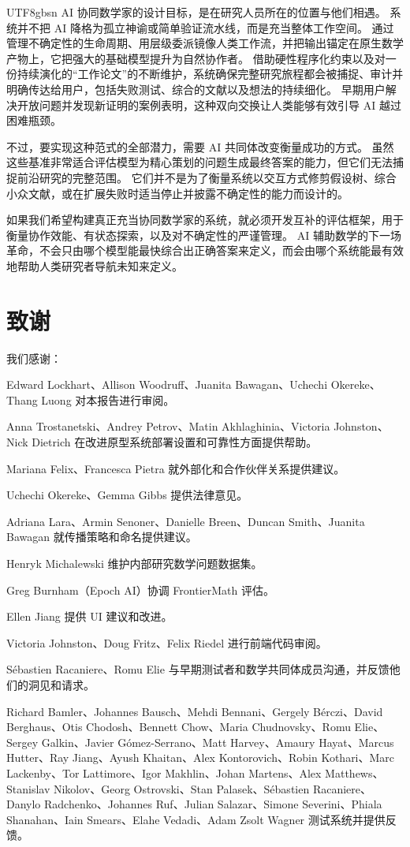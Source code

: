 \documentclass[11pt, a4paper, copyright, gdm]{google}
\begin{document}
\begin{CJK*}{UTF8}{gbsn}
AI 协同数学家的设计目标，是在研究人员所在的位置与他们相遇。
系统并不把 AI 降格为孤立神谕或简单验证流水线，而是充当整体工作空间。
通过管理不确定性的生命周期、用层级委派镜像人类工作流，并把输出锚定在原生数学产物上，它把强大的基础模型提升为自然协作者。
借助硬性程序化约束以及对一份持续演化的“工作论文”的不断维护，系统确保完整研究旅程都会被捕捉、审计并明确传达给用户，包括失败测试、综合的文献以及想法的持续细化。
早期用户解决开放问题并发现新证明的案例表明，这种双向交换让人类能够有效引导 AI 越过困难瓶颈。

不过，要实现这种范式的全部潜力，需要 AI 共同体改变衡量成功的方式。
虽然这些基准非常适合评估模型为精心策划的问题生成最终答案的能力，但它们无法捕捉前沿研究的完整范围。
它们并不是为了衡量系统以交互方式修剪假设树、综合小众文献，或在扩展失败时适当停止并披露不确定性的能力而设计的。

如果我们希望构建真正充当协同数学家的系统，就必须开发互补的评估框架，用于衡量协作效能、有状态探索，以及对不确定性的严谨管理。
AI 辅助数学的下一场革命，不会只由哪个模型能最快综合出正确答案来定义，而会由哪个系统能最有效地帮助人类研究者导航未知来定义。

\section*{致谢}

我们感谢：

Edward Lockhart、Allison Woodruff、Juanita Bawagan、Uchechi Okereke、Thang Luong 对本报告进行审阅。

Anna Trostanetski、Andrey Petrov、Matin Akhlaghinia、Victoria Johnston、Nick Dietrich 在改进原型系统部署设置和可靠性方面提供帮助。

Mariana Felix、Francesca Pietra 就外部化和合作伙伴关系提供建议。

Uchechi Okereke、Gemma Gibbs 提供法律意见。

Adriana Lara、Armin Senoner、Danielle Breen、Duncan Smith、Juanita Bawagan 就传播策略和命名提供建议。

Henryk Michalewski 维护内部研究数学问题数据集。

Greg Burnham（Epoch AI）协调 FrontierMath 评估。

Ellen Jiang 提供 UI 建议和改进。

Victoria Johnston、Doug Fritz、Felix Riedel 进行前端代码审阅。

Sébastien Racaniere、Romu Elie 与早期测试者和数学共同体成员沟通，并反馈他们的洞见和请求。

Richard Bamler、Johannes Bausch、Mehdi Bennani、Gergely Bérczi、David Berghaus、Otis Chodosh、Bennett Chow、Maria Chudnovsky、Romu Elie、Sergey Galkin、Javier Gómez-Serrano、Matt Harvey、Amaury Hayat、Marcus Hutter、Ray Jiang、Ayush Khaitan、Alex Kontorovich、Robin Kothari、Marc Lackenby、Tor Lattimore、Igor Makhlin、Johan Martens、Alex Matthews、Stanislav Nikolov、Georg Ostrovski、Stan Palasek、Sébastien Racaniere、Danylo Radchenko、Johannes Ruf、Julian Salazar、Simone Severini、Phiala Shanahan、Iain Smears、Elahe Vedadi、Adam Zsolt Wagner 测试系统并提供反馈。


\end{CJK*}
\end{document}

